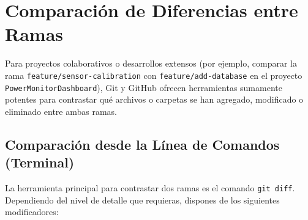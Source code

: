 \documentclass[
10pt, %
a4paper, %
oneside, %
headinclude,footinclude, %
BCOR5mm, %
]{scrartcl}
\begin{document}
\newpage
\section{Comparación de Diferencias entre Ramas}

Para proyectos colaborativos o desarrollos extensos (por ejemplo, comparar la rama \texttt{feature/sensor-calibration} con \texttt{feature/add-database} en el proyecto \texttt{PowerMonitorDashboard}), Git y GitHub ofrecen herramientas sumamente potentes para contrastar qué archivos o carpetas se han agregado, modificado o eliminado entre ambas ramas.

\subsection{Comparación desde la Línea de Comandos (Terminal)}
La herramienta principal para contrastar dos ramas es el comando \texttt{git diff}. Dependiendo del nivel de detalle que requieras, dispones de los siguientes modificadores:
\end{document}
